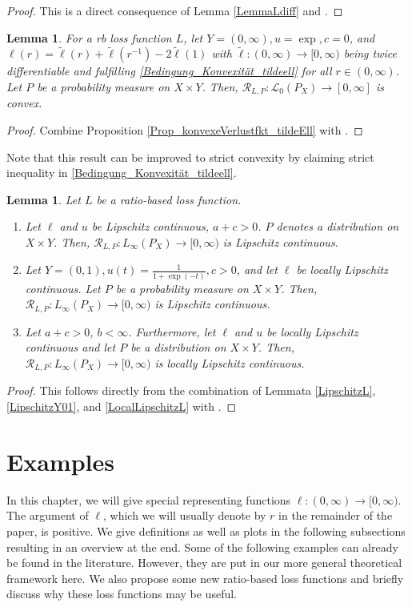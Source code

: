 \documentclass[10pt]{article}
\newcommand{\XY}{X \times Y}
\newcommand{\Lcal}{\mathcal{L}}
\newcommand{\RLP}{\mathcal{R}_{L,P}}
\newtheorem{lemma}[theorem]{Lemma}
\begin{document}
\begin{proof}
	This is a direct consequence of Lemma \ref{LemmaLdiff} and \cite[Lemma 2.21]{SC08}.
\end{proof}
\begin{lemma}
	For a rb loss function $L$, let $Y = (0, \infty), u = \exp, c = 0$, and $\ell(r) = \widetilde{\ell}(r) + \widetilde{\ell}(r^{-1})-2\widetilde{\ell}(1)$ with $\widetilde{\ell}: (0, \infty) \to [0, \infty)$ being twice differentiable and fulfilling \eqref{Bedingung_Konvexität_tildeell} for all $r \in (0, \infty)$.
	Let $P$ be a probability measure on $\XY$.
	Then, $\RLP: \Lcal_0(P_X) \to [0, \infty]$ is convex.
\end{lemma}
\begin{proof}
	Combine Proposition \ref{Prop_konvexeVerlustfkt_tildeEll} with \cite[Lemma 2.13]{SC08}.
\end{proof}
Note that this result can be improved to strict convexity by claiming strict inequality in \eqref{Bedingung_Konvexität_tildeell}. 
\begin{lemma}
	Let $L$ be a ratio-based loss function.
	\begin{enumerate}
		\item Let $\ell$ and $u$ be Lipschitz continuous, $a+c >0$. $P$ denotes a distribution on $\XY$.
		Then, $\RLP: L_\infty(P_X) \to [0, \infty)$ is Lipschitz continuous.
		\item Let $Y = (0,1), u(t) = \frac{1}{1+\exp(-t)}, c > 0$, and let $\ell$ be locally Lipschitz continuous. 
		Let $P$ be a probability measure on $\XY$.
		Then, $\RLP: L_\infty(P_X) \to [0, \infty)$ is Lipschitz continuous.
		\item Let $a+c > 0$, $b < \infty$. Furthermore, let $\ell$ and $u$ be locally Lipschitz continuous and let $P$ be a distribution on $\XY$.
		Then, $\RLP: L_\infty(P_X) \to [0, \infty)$ is locally Lipschitz continuous.
	\end{enumerate}
\end{lemma}
\begin{proof}
	This follows directly from the combination of Lemmata \ref{LipschitzL}, \ref{LipschitzY01}, and \ref{LocalLipschitzL} with \cite[Lemma 2.19]{SC08}.
\end{proof}


\section{Examples} \label{Kap_Bsp}
In this chapter, we will give special representing functions $\ell: (0, \infty) \to [0, \infty)$. 
The argument of $\ell$, which we will usually denote by $r$ in the remainder of the paper, is positive.
We give definitions as well as plots in the following subsections resulting in an overview at the end.
Some of the following examples can already be found in the literature. 
However, they are put in our more general theoretical framework here.
We also propose some new ratio-based loss functions and briefly discuss why these loss functions may be useful. 
\end{document}
